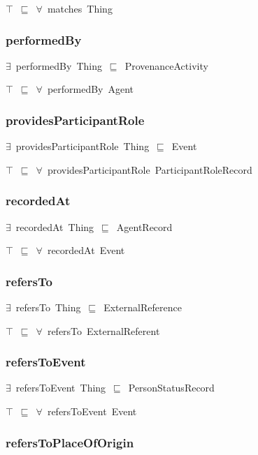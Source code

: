 \documentclass{article}
\begin{document}
\ensuremath{\top}~\ensuremath{\sqsubseteq}~\ensuremath{\forall}~matches~Thing

\subsubsection*{performedBy}

\ensuremath{\exists}~performedBy~Thing~\ensuremath{\sqsubseteq}~ProvenanceActivity

\ensuremath{\top}~\ensuremath{\sqsubseteq}~\ensuremath{\forall}~performedBy~Agent

\subsubsection*{providesParticipantRole}

\ensuremath{\exists}~providesParticipantRole~Thing~\ensuremath{\sqsubseteq}~Event

\ensuremath{\top}~\ensuremath{\sqsubseteq}~\ensuremath{\forall}~providesParticipantRole~ParticipantRoleRecord

\subsubsection*{recordedAt}

\ensuremath{\exists}~recordedAt~Thing~\ensuremath{\sqsubseteq}~AgentRecord

\ensuremath{\top}~\ensuremath{\sqsubseteq}~\ensuremath{\forall}~recordedAt~Event

\subsubsection*{refersTo}

\ensuremath{\exists}~refersTo~Thing~\ensuremath{\sqsubseteq}~ExternalReference

\ensuremath{\top}~\ensuremath{\sqsubseteq}~\ensuremath{\forall}~refersTo~ExternalReferent

\subsubsection*{refersToEvent}

\ensuremath{\exists}~refersToEvent~Thing~\ensuremath{\sqsubseteq}~PersonStatusRecord

\ensuremath{\top}~\ensuremath{\sqsubseteq}~\ensuremath{\forall}~refersToEvent~Event

\subsubsection*{refersToPlaceOfOrigin}
\end{document}
